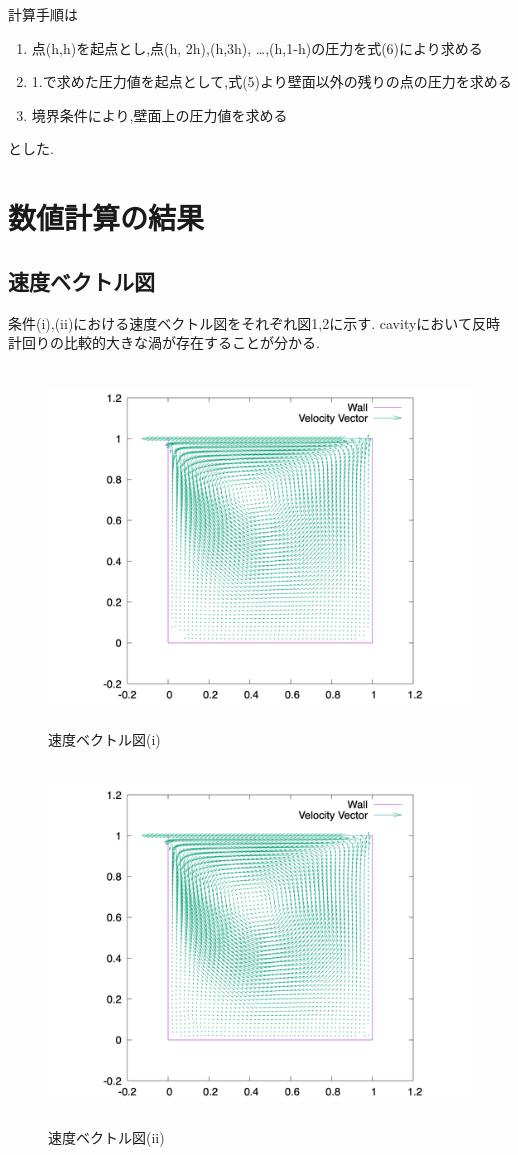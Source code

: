 \documentclass[upLaTeX,a4paper]{jsarticle}
\begin{document}
計算手順は
\begin{enumerate}
  \item 点(h,h)を起点とし,点(h, 2h),(h,3h), \ldots ,(h,1-h)の圧力を式(6)により求める
  \item 1.で求めた圧力値を起点として,式(5)より壁面以外の残りの点の圧力を求める
  \item 境界条件により,壁面上の圧力値を求める
\end{enumerate}
とした.


\section{数値計算の結果}
\subsection{速度ベクトル図}
条件(i),(ii)における速度ベクトル図をそれぞれ図1,2に示す.
cavityにおいて反時計回りの比較的大きな渦が存在することが分かる.

\begin{figure}[H]
  \centering
  \includegraphics[height=9.5cm]{outputs/img/velocity_vector_re50.png}
  \caption{速度ベクトル図(i)}
  \label{fig:velocity_vector_re50}
\end{figure}
\begin{figure}[H]
  \centering
  \includegraphics[height=9.5cm]{outputs/img/velocity_vector_re200.png}
  \caption{速度ベクトル図(ii)}
  \label{fig:velocity_vector_re200}
\end{figure}
\end{document}

